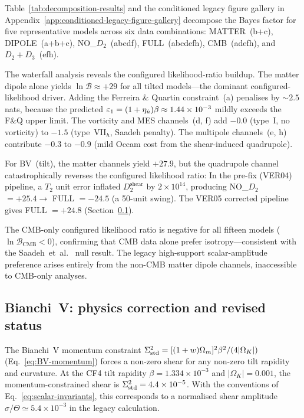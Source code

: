 Table~\ref{tab:decomposition-results} and
the conditioned legacy figure gallery in Appendix~\ref{app:conditioned-legacy-figure-gallery} decompose the Bayes factor
for five representative models across six data combinations:
MATTER~(b+c), DIPOLE~(a+b+c), NO\_$D_2$~(abcdf),
FULL~(abcdefh), CMB~(adefh), and $D_2{+}D_3$~(efh).

The waterfall analysis reveals the configured likelihood-ratio buildup.  The
matter dipole alone yields $\ln\mathcal{B} \approx +29$ for
all tilted models---the dominant configured-likelihood driver.  Adding the
Ferreira \& Quartin constraint~(a) penalises by $\sim 2.5$
nats, because the predicted
$\varepsilon_1 = (1+\eta_{\dot{u}})\beta \approx 1.44 \times 10^{-3}$
mildly exceeds the F\&Q upper limit.  The vorticity and MES
channels~(d, f) add $-0.0$ (type~I, no vorticity) to $-1.5$
(type~VII$_h$, Saadeh penalty).  The multipole channels~(e, h)
contribute $-0.3$ to $-0.9$ (mild Occam cost from the
shear-induced quadrupole).

For BV~(tilt), the matter channels yield $+27.9$, but the
quadrupole channel catastrophically reverses the configured likelihood ratio:
In the pre-fix (VER04) pipeline, a $T_2$ unit error inflated
$D_2^{\mathrm{shear}}$ by $2\times10^{14}$, producing
NO\_$D_2$ $= +25.4 \to$ FULL $= -24.5$ (a 50-unit swing).
The VER05 corrected pipeline gives FULL $= +24.8$
(Section~\ref{sec:BV-excl}).

The CMB-only configured likelihood ratio is negative for all fifteen models
($\ln\mathcal{B}_{\mathrm{CMB}} < 0$), confirming that CMB
data alone prefer isotropy---consistent with the
Saadeh~et~al.~\cite{Saadeh2016b} null result.  The legacy
high-support scalar-amplitude preference arises entirely from
the non-CMB matter dipole channels, inaccessible to CMB-only
analyses.


\subsection{Bianchi~V: physics correction and revised status}\label{sec:BV-excl}

The Bianchi~V momentum constraint
$\Sigma^2_{\mathrm{std}} = [(1+w)\Omega_m]^2\beta^2/(4|\Omega_K|)$
(Eq.~\eqref{eq:BV-momentum}) forces a non-zero shear for any
non-zero tilt rapidity and curvature.
At the CF4 tilt rapidity $\beta = 1.334 \times 10^{-3}$ and
$|\Omega_K| = 0.001$, the momentum-constrained shear is
$\Sigma^2_{\mathrm{std}} = 4.4 \times 10^{-5}$.  With the conventions of
Eq.~\eqref{eq:scalar-invariants}, this corresponds to a
normalised shear amplitude $\sigma/\Theta \simeq 5.4 \times
10^{-3}$ in the legacy calculation.

